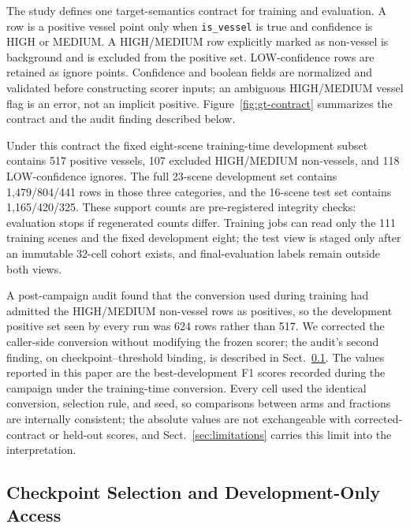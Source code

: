 The study defines one target-semantics contract for training and evaluation.
A row is a positive vessel point only when \texttt{is\_vessel} is true and
confidence is HIGH or MEDIUM. A HIGH/MEDIUM row explicitly marked as
non-vessel is background and is excluded from the positive set.
LOW-confidence rows are retained as ignore points. Confidence and boolean
fields are normalized and validated before constructing scorer inputs; an
ambiguous HIGH/MEDIUM vessel flag is an error, not an implicit positive.
Figure~\ref{fig:gt-contract} summarizes the contract and the audit finding
described below.



Under this contract the fixed eight-scene training-time development subset
contains 517 positive vessels, 107 excluded HIGH/MEDIUM non-vessels, and 118
LOW-confidence ignores. The full 23-scene development set contains
1,479/804/441 rows in those three categories, and the 16-scene test set
contains 1,165/420/325. These support counts are pre-registered integrity
checks: evaluation stops if regenerated counts differ. Training jobs can read
only the 111 training scenes and the fixed development eight; the test view
is staged only after an immutable 32-cell cohort exists, and final-evaluation
labels remain outside both views.

A post-campaign audit found that the conversion used during training had
admitted the HIGH/MEDIUM non-vessel rows as positives, so the development
positive set seen by every run was 624 rows rather than 517. We corrected the
caller-side conversion without modifying the frozen scorer; the audit's
second finding, on checkpoint--threshold binding, is described in
Sect.~\ref{sec:checkpoint-selection}. The values reported in this paper are
the best-development F1 scores recorded during the campaign under the
training-time conversion. Every cell used the
identical conversion, selection rule, and seed, so comparisons between arms
and fractions are internally consistent; the absolute values are not
exchangeable with corrected-contract or held-out scores, and
Sect.~\ref{sec:limitations} carries this limit into the interpretation.

\subsection{Checkpoint Selection and Development-Only Access}
\label{sec:checkpoint-selection}

